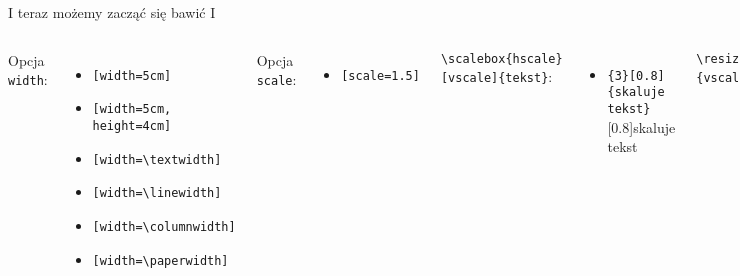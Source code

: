 \documentclass{beamer}
\newcommand{\tb}{\textbackslash}
\begin{document}
\begin{frame}{I teraz możemy zacząć się bawić I}{}
\begin{columns}
    Opcja \texttt{width}:
    \begin{itemize}[<+->]
        \item \texttt{[width=5cm]}
        \item \texttt{[width=5cm, height=4cm]}
        \item \texttt{[width=\tb{}textwidth]}
        \item \texttt{[width=\tb{}linewidth]}
        \item \texttt{[width=\tb{}columnwidth]}
        \item \texttt{[width=\tb{}paperwidth]}
    \end{itemize}\pause
    Opcja \texttt{scale}:
    \begin{itemize}
        \item \texttt{[scale=1.5]}
    \end{itemize}\pause%
    \texttt{\tb{scalebox}\{hscale\}[vscale]\{tekst\}}:
    \begin{itemize}
        \item \texttt{\{3\}[0.8]\{skaluje tekst\}\\}
        \scalebox{3}[0.8]{skaluje tekst}
    \end{itemize}\pause
    \texttt{\tb{resizebox}\{hscale\}\{vscale\}\{tekst\}}:
    \begin{itemize}
        \item \texttt{\{3cm\}\{0.8cm\}\{skaluje tekst\}\\}
        \item \texttt{\{2\tb{}hsize\}\{!\}\{skaluje tekst\}\\}
    \end{itemize}
    \begin{figure}
        \centering
        \texttt{[image: mem3]}
    \end{figure}
    \begin{figure}
        \centering
        \texttt{[image: mem3]}
    \end{figure}
    \begin{figure}
        \centering
        \texttt{[image: mem3]}
    \end{figure}
    \begin{figure}
        \centering
        \texttt{[image: mem3]}
    \end{figure}
 \end{columns} 
\end{frame}
\end{document}
